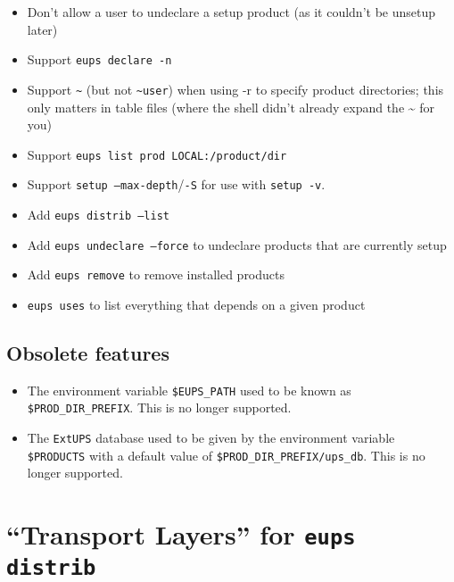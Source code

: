\documentclass{article}
\newcommand{\code}[1]{\texttt{#1}}
\newcommand{\eups}{\code{ExtUPS}}
\begin{document}
\begin{itemize}
  \item
    Don't allow a user to undeclare a setup product (as it couldn't be unsetup later)

  \item
    Support \code{eups declare -n}

  \item
    Support \code{\~} (but not \code{\~{}user}) when using -r to specify product directories;
    this only matters in table files (where the shell didn't already expand
    the \~{} for you)

  \item
    Support \code{eups list prod LOCAL:/product/dir}

  \item
    Support \code{setup --max-depth}/\code{-S} for use with \code{setup -v}.

  \item
    Add \code{eups distrib --list}

  \item
    Add \code{eups undeclare --force} to undeclare products that are currently
    setup

  \item
    Add \code{eups remove} to remove installed products

  \item \code{eups uses} to list everything that depends on a given product
    
\end{itemize}

\subsection{Obsolete features}

\begin{itemize}
  \item The environment variable \code{\$EUPS\_PATH} used to be known
  as \code{\$PROD\_DIR\_PREFIX}. This is no longer supported.

  \item The \eups{} database used to be given by the environment variable \code{\$PRODUCTS}
    with a default value of \code{\$PROD\_DIR\_PREFIX/ups\_db}. This is no longer supported.
\end{itemize}

\section{``Transport Layers'' for \code{eups distrib}}
\label{pacman}
\end{document}
